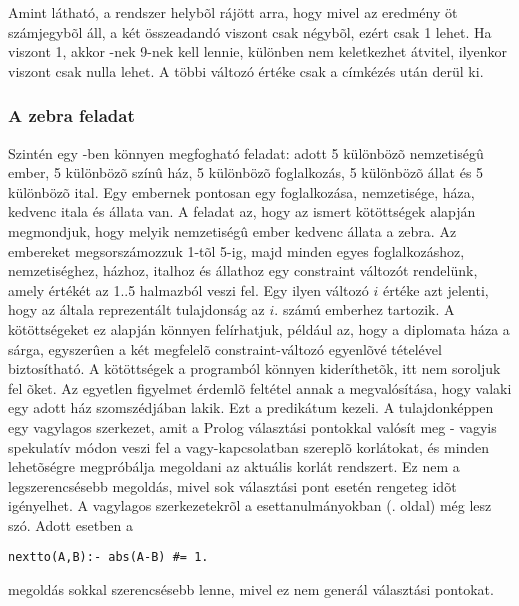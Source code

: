 Amint látható, a rendszer helybõl rájött arra, hogy mivel az eredmény öt
számjegybõl áll, a két összeadandó viszont csak négybõl, ezért 
csak 1 lehet. Ha viszont  1, akkor -nek 9-nek kell lennie,
különben nem keletkezhet átvitel, ilyenkor viszont  csak nulla lehet.
A többi változó értéke csak a címkézés után derül ki.

\subsubsection{A zebra feladat}
Szintén egy \Clpfd -ben könnyen megfogható feladat: adott 5 különbözõ
nemzetiségû ember, 5 különbözõ színû ház, 5 különbözõ foglalkozás, 5
különbözõ állat és 5 különbözõ ital. Egy embernek pontosan egy
foglalkozása, nemzetisége, háza, kedvenc itala és állata van. A
feladat az, hogy az ismert kötöttségek alapján megmondjuk, hogy melyik
nemzetiségû ember kedvenc állata a zebra. Az embereket megsorszámozzuk
1-tõl 5-ig, majd minden egyes foglalkozáshoz, nemzetiséghez, házhoz,
italhoz és állathoz egy constraint változót rendelünk, amely értékét
az 1..5 halmazból veszi fel. Egy ilyen változó $i$ értéke azt jelenti,
hogy az általa reprezentált tulajdonság az $i$. számú emberhez
tartozik. A kötöttségeket ez alapján könnyen felírhatjuk, például az,
hogy a diplomata háza a sárga, egyszerûen a két megfelelõ
constraint-változó egyenlõvé tételével biztosítható.  A kötöttségek a
programból könnyen kideríthetõk, itt nem soroljuk fel õket. Az
egyetlen figyelmet érdemlõ feltétel annak a megvalósítása, hogy
valaki egy adott ház szomszédjában lakik. Ezt a  predikátum
kezeli. A  tulajdonképpen egy vagylagos szerkezet, amit a
Prolog választási pontokkal valósít meg - vagyis spekulatív módon veszi fel a
vagy-kapcsolatban szereplõ korlátokat, és minden lehetõségre
megpróbálja megoldani az aktuális korlát rendszert. Ez nem a legszerencsésebb
megoldás, mivel sok választási pont esetén rengeteg idõt igényelhet. A
vagylagos szerkezetekrõl a \clpfd esettanulmányokban (\pageref{diszjunkcio}.
oldal) még lesz szó. Adott esetben a 

\begin{verbatim}
nextto(A,B):- abs(A-B) #= 1.
\end{verbatim}

megoldás sokkal szerencsésebb lenne, mivel ez nem generál választási
pontokat.

